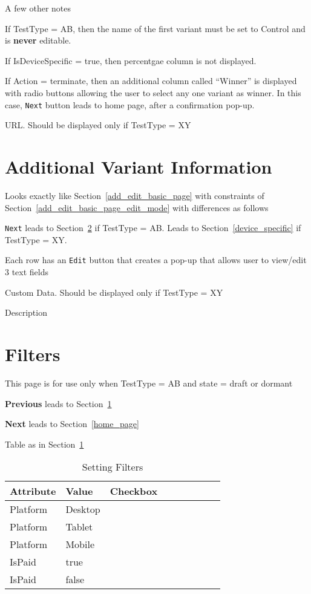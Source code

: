 \documentclass[letterpaper]{article}
\begin{document}
A few other notes
\bi
\item If TestType = AB, then the name of the first variant must be set to
  Control and is {\bf never} editable.
\item 
If IsDeviceSpecific = true, then percentgae column is not displayed.
\item If Action = terminate, then an additional column called ``Winner'' is
displayed with radio buttons allowing the user to select any one variant as
winner. In this case, {\tt Next} button leads to home page, after a confirmation
pop-up.
\item URL.  Should be displayed only if TestType = XY
\ei

\section{Additional Variant Information}
\label{addnl_variant_info}
Looks exactly like Section~\ref{add_edit_basic_page}
with constraints of Section~\ref{add_edit_basic_page_edit_mode} with differences as follows
\be
\item {\tt Next} leads to Section~\ref{filters} if TestType = AB. 
Leads to Section~\ref{device_specific} if TestType = XY. 
\item Each row has
an {\tt Edit} button that creates a pop-up that allows user to view/edit 3 text
fields
\be
\item Custom Data.
  Should be displayed only if TestType = XY
\item Description
\ee
\ee

\section{Filters}
\label{filters}
This page is for use only when TestType = AB and state = draft or dormant
\be
\item {\bf Previous} leads to Section~\ref{addnl_variant_info}
\item {\bf Next} leads to Section~\ref{home_page}
\item Table as in Section~\ref{tbl_filters}
  \ee
\begin{table}[hb]
\centering
\begin{tabular}{|l|l|l|l|l|l|l|l|l|}  \hline \hline
  {\bf Attribute} &   {\bf Value} & {\bf Checkbox} \\ \hline \hline
  Platform & Desktop & \\ \hline
  Platform & Tablet & \\ \hline
  Platform & Mobile & \\ \hline
  \hline
  IsPaid & true & \\ \hline
  IsPaid & false & \\ \hline
\hline
\end{tabular}
\caption{Setting Filters}
\label{tbl_filters}
\end{table}
\end{document}
